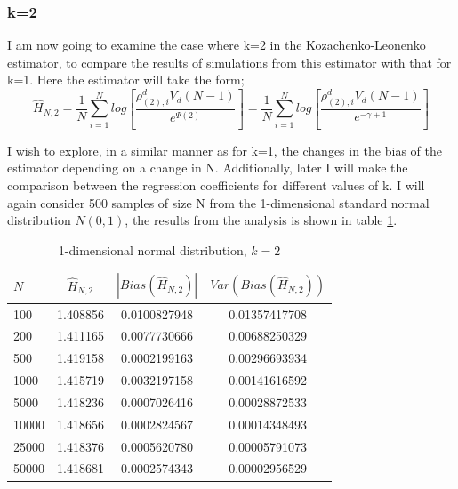 \documentclass{article}
\begin{document}
\subsubsection{k=2} \label{N_k=2}

I am now going to examine the case where k=2 in the Kozachenko-Leonenko estimator, to compare the results of simulations from this estimator with that for k=1. Here the estimator will take the form;
\begin{equation}
\hat{H}_{N, 2} = \frac{1}{N} \sum_{i=1}^{N} log \left[ \frac{\rho_{(2),i}^{d} V_{d} (N-1)}{e^{\Psi(2)}} \right] = \frac{1}{N} \sum_{i=1}^{N} log \left[ \frac{\rho_{(2),i}^{d} V_{d} (N-1)}{e^{-\gamma + 1}} \right] \nonumber
\end{equation}

I wish to explore, in a similar manner as for k=1, the changes in the bias of the estimator depending on a change in N. Additionally, later I will make the comparison between the regression coefficients for different values of k. I will again consider 500 samples of size N from the 1-dimensional standard normal distribution $N(0, 1)$, the results from the analysis is shown in table \ref{normal_k=2_table}.

\begin{table}
\caption{1-dimensional normal distribution, $k=2$} \label{normal_k=2_table}
\begin{center}
\begin{tabular}{| l | c c c|} 
\toprule
$N$ & $\hat{H}_{N, 2}$ & $|Bias(\hat{H}_{N, 2})|$ & $Var(Bias(\hat{H}_{N, 2}))$ \\
\midrule[1pt]
100     & 1.408856     & 0.0100827948     & 0.01357417708  \\
200     & 1.411165     & 0.0077730666     & 0.00688250329  \\
500     & 1.419158     & 0.0002199163     & 0.00296693934  \\
1000    & 1.415719     & 0.0032197158     & 0.00141616592  \\
5000    & 1.418236     & 0.0007026416     & 0.00028872533  \\
10000   & 1.418656     & 0.0002824567     & 0.00014348493  \\
25000   & 1.418376     & 0.0005620780     & 0.00005791073  \\
50000   & 1.418681     & 0.0002574343     & 0.00002956529  \\
\hline
\end{tabular}
\end{center}
\end{table}
\end{document}
